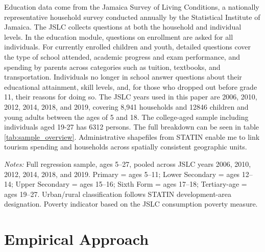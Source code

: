 \documentclass[12pt]{article}
\newcommand*{\TableSumPath}{../Paper_3_Tables/Summary_Stats}
\begin{document}
	Education data come from the Jamaica Survey of Living Conditions, a nationally representative household survey conducted annually by the Statistical Institute of Jamaica. The JSLC collects questions at both the household and individual levels. In the education module, questions on enrollment are asked for all individuals. For currently enrolled children and youth, detailed questions cover the type of school attended, academic progress and exam performance, and spending by parents across categories such as tuition, textbooks, and transportation. Individuals no longer in school answer questions about their educational attainment, skill levels, and, for those who dropped out before grade 11, their reasons for doing so. The JSLC years used in this paper are 2006, 2010, 2012, 2014, 2018, and 2019, covering 8,941 households and 12846 children and young adults between the ages of 5 and 18. The college-aged sample including individuals aged 19-27 has 6312 persons. The full breakdown can be seen in table \ref{tab:sample_overview}. Administrative shapefiles from STATIN enable me to link tourism spending and households across spatially consistent geographic units.

	\begin{table}[h]
	\centering
	\begin{threeparttable}
		\caption{Sample Overview}
		\label{tab:sample_overview}
		{\small}
		\begin{tablenotes}
			\small
			\item \textit{Notes:} Full regression sample, ages 5--27, pooled across JSLC years 2006, 2010, 2012, 2014, 2018, and 2019. Primary = ages 5--11; Lower Secondary = ages 12--14; Upper Secondary = ages 15--16; Sixth Form = ages 17--18; Tertiary-age = ages 19--27. Urban/rural classification follows STATIN development-area designation. Poverty indicator based on the JSLC consumption poverty measure.
		\end{tablenotes}
	\end{threeparttable}
	\end{table}


	\section{Empirical Approach}
	\label{section:empirics}
	
\end{document}
